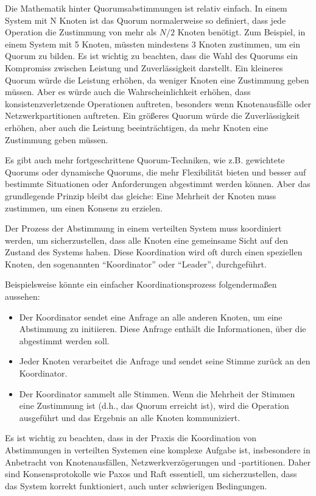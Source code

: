 Die Mathematik hinter Quorumsabstimmungen ist relativ einfach. In einem System mit N Knoten ist das Quorum normalerweise so definiert, dass jede Operation die Zustimmung von mehr als $N/2$ Knoten benötigt. Zum Beispiel, in einem System mit 5 Knoten, müssten mindestens 3 Knoten zustimmen, um ein Quorum zu bilden.
Es ist wichtig zu beachten, dass die Wahl des Quorums ein Kompromiss zwischen Leistung und Zuverlässigkeit darstellt. Ein kleineres Quorum würde die Leistung erhöhen, da weniger Knoten eine Zustimmung geben müssen. Aber es würde auch die Wahrscheinlichkeit erhöhen, dass konsistenzverletzende Operationen auftreten, besonders wenn Knotenausfälle oder Netzwerkpartitionen auftreten. Ein größeres Quorum würde die Zuverlässigkeit erhöhen, aber auch die Leistung beeinträchtigen, da mehr Knoten eine Zustimmung geben müssen.

Es gibt auch mehr fortgeschrittene Quorum-Techniken, wie z.B. gewichtete Quorums oder dynamische Quorums, die mehr Flexibilität bieten und besser auf bestimmte Situationen oder Anforderungen abgestimmt werden können. Aber das grundlegende Prinzip bleibt das gleiche: Eine Mehrheit der Knoten muss zustimmen, um einen Konsens zu erzielen.

Der Prozess der Abstimmung in einem verteilten System muss koordiniert werden, um sicherzustellen, dass alle Knoten eine gemeinsame Sicht auf den Zustand des Systems haben. Diese Koordination wird oft durch einen speziellen Knoten, den sogenannten \enquote{Koordinator} oder \enquote{Leader}, durchgeführt.

Beispielsweise könnte ein einfacher Koordinationsprozess folgendermaßen aussehen:
\begin{itemize}
\item Der Koordinator sendet eine Anfrage an alle anderen Knoten, um eine Abstimmung zu initiieren. Diese Anfrage enthält die Informationen, über die abgestimmt werden soll.
\item Jeder Knoten verarbeitet die Anfrage und sendet seine Stimme zurück an den Koordinator.
\item Der Koordinator sammelt alle Stimmen. Wenn die Mehrheit der Stimmen eine Zustimmung ist (d.h., das Quorum erreicht ist), wird die Operation ausgeführt und das Ergebnis an alle Knoten kommuniziert.
\end{itemize}

Es ist wichtig zu beachten, dass in der Praxis die Koordination von Abstimmungen in verteilten Systemen eine komplexe Aufgabe ist, insbesondere in Anbetracht von Knotenausfällen, Netzwerkverzögerungen und -partitionen. Daher sind Konsensprotokolle wie Paxos und Raft essentiell, um sicherzustellen, dass das System korrekt funktioniert, auch unter schwierigen Bedingungen.

